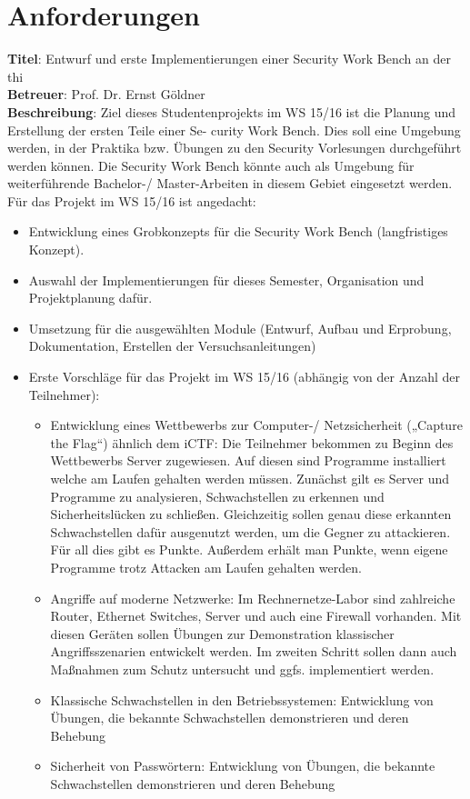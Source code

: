 \chapter{Anforderungen}

\textbf{Titel}: Entwurf und erste Implementierungen einer Security Work Bench an der thi \\
\textbf{Betreuer}: Prof. Dr. Ernst Göldner\\
\textbf{Beschreibung}:
Ziel dieses Studentenprojekts im WS 15/16 ist die Planung und Erstellung der ersten Teile einer Se-
curity Work Bench. Dies soll eine Umgebung werden, in der Praktika bzw. Übungen zu den Security
Vorlesungen durchgeführt werden können. Die Security Work Bench könnte auch als Umgebung für
weiterführende Bachelor-/ Master-Arbeiten in diesem Gebiet eingesetzt werden.\\
Für das Projekt im WS 15/16 ist angedacht:

\begin{itemize}
\item Entwicklung eines Grobkonzepts für die Security Work Bench (langfristiges Konzept).
\item Auswahl der Implementierungen für dieses Semester, Organisation und Projektplanung dafür.
\item Umsetzung für die ausgewählten Module (Entwurf, Aufbau und Erprobung, Dokumentation, Erstellen der Versuchsanleitungen)
\item Erste Vorschläge für das Projekt im WS 15/16 (abhängig von der Anzahl der Teilnehmer):
	\begin{itemize}
	\item Entwicklung eines Wettbewerbs zur Computer-/ Netzsicherheit („Capture the Flag“) ähnlich dem iCTF: Die Teilnehmer bekommen zu Beginn des Wettbewerbs Server zugewiesen. Auf diesen sind Programme installiert welche am Laufen gehalten werden müssen. Zunächst gilt es Server und Programme zu analysieren, Schwachstellen zu erkennen und Sicherheitslücken zu schließen. Gleichzeitig sollen genau diese erkannten Schwachstellen dafür ausgenutzt werden, um die Gegner zu attackieren. Für all dies gibt es Punkte. Außerdem erhält man Punkte, wenn eigene Programme trotz Attacken am Laufen gehalten werden.
	\item Angriffe auf moderne Netzwerke: Im Rechnernetze-Labor sind zahlreiche Router, Ethernet Switches, Server und auch eine Firewall vorhanden. Mit diesen Geräten sollen Übungen zur Demonstration klassischer Angriffsszenarien entwickelt werden. Im zweiten Schritt sollen dann auch Maßnahmen zum Schutz untersucht und ggfs. implementiert werden.
	\item Klassische Schwachstellen in den Betriebssystemen: Entwicklung von Übungen, die bekannte Schwachstellen demonstrieren und deren Behebung
	\item Sicherheit von Passwörtern: Entwicklung von Übungen, die bekannte Schwachstellen demonstrieren und deren Behebung
	\end{itemize}
\end{itemize}

